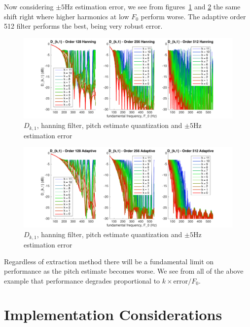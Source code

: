 \documentclass [11pt, proquest] {uwthesis}[2015/03/03]
\begin{document}
Now considering $\pm5$Hz estimation error, we see from figures~\ref{fig:pitch_d_ki_1_error5} and \ref{fig:pitch_d_ki_2_error5} the same shift right where higher harmonics at low $F_0$ perform worse.  The adaptive order 512 filter performs the best, being very robust error.

\begin{figure}[!ht]
  \centering
    \includegraphics[width=1\textwidth]{pitch_d_ki_1_error5}
    \caption{$D_{k,1}$, hanning filter, pitch estimate quantization and $\pm5$Hz estimation error}\label{fig:pitch_d_ki_1_error5}
\end{figure}

\begin{figure}[!ht]
  \centering
    \includegraphics[width=1\textwidth]{pitch_d_ki_2_error5}
    \caption{$D_{k,1}$, hanning filter, pitch estimate quantization and $\pm5$Hz estimation error}\label{fig:pitch_d_ki_2_error5}
\end{figure}

Regardless of extraction method there will be a fundamental limit on performance as the pitch estimate becomes worse.  We see from all of the above example that performance degrades proportional to $k \times \mathrm{error} / F_0$.


\chapter{Implementation Considerations}
\end{document}

